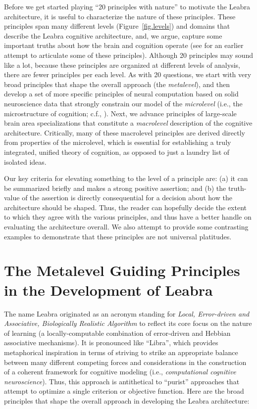 \documentclass[11pt,twoside]{article}
\begin{document}
Before we get started playing ``20 principles with nature'' to motivate the
Leabra architecture, it is useful to characterize the nature of these
principles.  These principles span many different levels
(Figure~\ref{fig.levels}) and domains that describe the Leabra cognitive
architecture, and, we argue, capture some important truths about how the brain
and cognition operate (see  for an earlier attempt to
articulate some of these principles).  Although 20 principles may sound like a
lot, because these principles are organized at different levels of analysis,
there are fewer principles per each level.  As with 20 questions, we start
with very broad principles that shape the overall approach (the {\em
  metalevel}), and then develop a set of more specific principles of neural
computation based on solid neuroscience data that strongly constrain our model
of the {\em microlevel} (i.e., the microstructure of cognition; c.f.,
).
Next, we advance principles of large-scale brain area specializations that
constitute a {\em macrolevel} description of the cognitive architecture.
Critically, many of these macrolevel principles are derived directly from
properties of the microlevel, which is essential for establishing a truly
integrated, unified theory of cognition, as opposed to just a laundry list of
isolated ideas.

Our key criteria for elevating something to the level of a principle are: (a)
it can be summarized briefly and makes a strong positive assertion; and (b)
the truth-value of the assertion is directly consequential for a decision
about how the architecture should be shaped.  Thus, the reader can hopefully
decide the extent to which they agree with the various principles, and thus
have a better handle on evaluating the architecture overall.  We also attempt
to provide some contrasting examples to demonstrate that these principles are
not universal platitudes.

\section{The Metalevel Guiding Principles in the Development of Leabra}

The name Leabra originated as an acronym standing for {\em Local, Error-driven
  and Associative, Biologically Realistic Algorithm} to reflect its core focus
on the nature of learning (a locally-computable combination of error-driven
and Hebbian associative mechanisms). It is pronounced like ``Libra'', which
provides metaphorical inspiration in terms of striving to strike an
appropriate balance between many different competing forces and considerations
in the construction of a coherent framework for cognitive modeling (i.e., {\em
  computational cognitive neuroscience}).  Thus, this approach is antithetical
to ``purist'' approaches that attempt to optimize a single criterion or
objective function.  Here are the broad principles that shape the overall
approach in developing the Leabra architecture:
\end{document}
